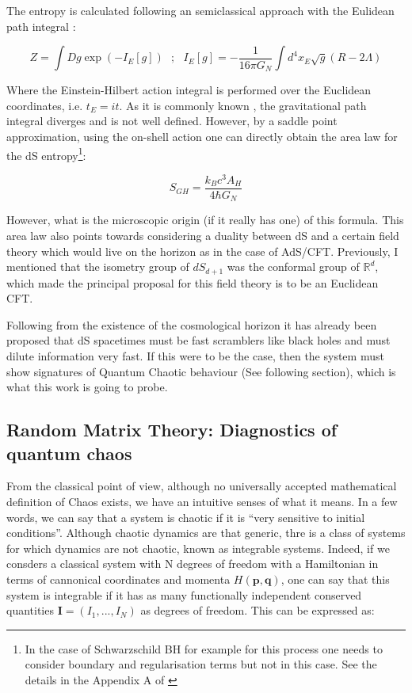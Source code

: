 \documentclass[11pt,a4paper]{article}
\begin{document}
The entropy is calculated following an semiclassical approach with the Eulidean path integral \cite{PhysRevD.15.2752}:

\begin{equation}
    Z = \int Dg \exp\left(-I_E[g]\right) ~~~;~~~ I_E[g] = -\frac{1}{16\pi G_N}\int d^4 x_E \sqrt{g}(R-2\Lambda)
\end{equation}

Where the Einstein-Hilbert action integral is performed over the Euclidean coordinates, i.e. $t_E=it$. As it is commonly known \cite{gibbons_path_1978}, the gravitational path integral diverges and is not well defined. However, by a saddle point approximation, using the on-shell action one can directly obtain the area law for the dS entropy\footnote{In the case of Schwarzschild BH for example for this process one needs to consider boundary and regularisation terms but not in this case. See the details in the Appendix A of \cite{Galante:2023uyf}}:

\begin{equation}
    S_{GH} = \frac{k_Bc^3A_H}{4\hbar G_N}
\end{equation}

However, what is the microscopic origin (if it really has one) of this formula. This area law also points towards considering a duality between dS and a certain field theory which would live on the horizon as in the case of AdS/CFT. Previously, I mentioned that the isometry group of $dS_{d+1}$ was the conformal group of $\mathds{R}^d$, which made the principal proposal for this field theory is to be an Euclidean CFT.

Following from the existence of the cosmological horizon it has already been proposed that dS spacetimes must be fast scramblers \cite{Geng_2021} like black holes and must dilute information very fast. If this were to be the case, then the system must show signatures of Quantum Chaotic behaviour (See following section), which is what this work is going to probe.

\subsection{Random Matrix Theory: Diagnostics of quantum chaos}

From the classical point of view, although no universally accepted mathematical definition of Chaos exists, we have an intuitive senses of what it means. In a few words, we can say that a system is chaotic if it is \textquotedblleft very sensitive to initial conditions\textquotedblright. Although chaotic dynamics are that generic, thre is a class of systems 
for which dynamics are not chaotic, known as integrable systems. Indeed, if we consders a classical system with N degrees of freedom with a Hamiltonian in terms of cannonical coordinates and momenta $H(\mathbf{p},\mathbf{q})$, one can say that this system is integrable if it has as many functionally independent conserved quantities $\mathbf{I}=\left(I_1,...,I_N\right)$ as degrees of freedom. This can be expressed as:
\end{document}
